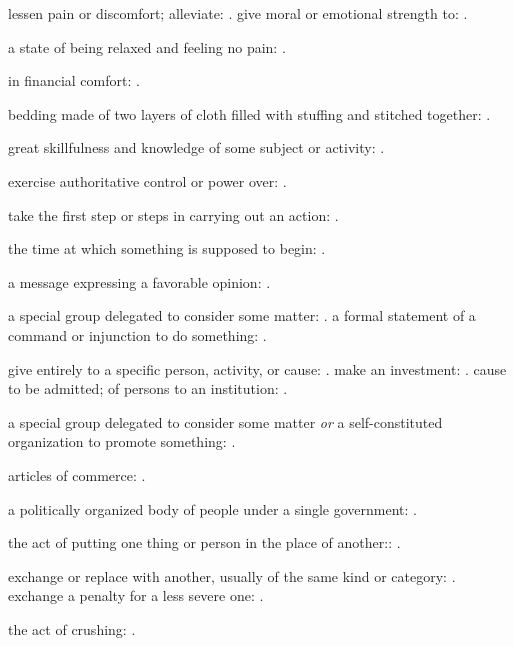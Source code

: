   lessen pain or discomfort; alleviate: . give moral or emotional strength to: .

  a state of being relaxed and feeling no pain: .

  in financial comfort: .

  bedding made of two layers of cloth filled with stuffing and stitched together: .

  great skillfulness and knowledge of some subject or activity: .

  exercise authoritative control or power over: .

  take the first step or steps in carrying out an action: .

  the time at which something is supposed to begin: .

  a message expressing a favorable opinion: .

  a special group delegated to consider some matter: . a formal statement of a command or injunction to do something: .

  give entirely to a specific person, activity, or cause: . make an investment: . cause to be admitted; of persons to an institution: .

  a special group delegated to consider some matter \textit{or} a self-constituted organization to promote something: .

  articles of commerce: .

  a politically organized body of people under a single government: .

  the act of putting one thing or person in the place of another:: .

  exchange or replace with another, usually of the same kind or category: . exchange a penalty for a less severe one: .

  the act of crushing: .

